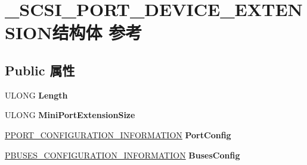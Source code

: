 \hypertarget{struct___s_c_s_i___p_o_r_t___d_e_v_i_c_e___e_x_t_e_n_s_i_o_n}{}\section{\+\_\+\+S\+C\+S\+I\+\_\+\+P\+O\+R\+T\+\_\+\+D\+E\+V\+I\+C\+E\+\_\+\+E\+X\+T\+E\+N\+S\+I\+O\+N结构体 参考}
\label{struct___s_c_s_i___p_o_r_t___d_e_v_i_c_e___e_x_t_e_n_s_i_o_n}
\subsection*{Public 属性}
\begin{DoxyCompactItemize}
\item 
\mbox{\label{struct___s_c_s_i___p_o_r_t___d_e_v_i_c_e___e_x_t_e_n_s_i_o_n_a90529db2da91788a5872c07b2e9a221b}} 
U\+L\+O\+NG {\bfseries Length}
\item 
\mbox{\label{struct___s_c_s_i___p_o_r_t___d_e_v_i_c_e___e_x_t_e_n_s_i_o_n_ab9b46eb57c1fa0cb274417f53e8636fd}} 
U\+L\+O\+NG {\bfseries Mini\+Port\+Extension\+Size}
\item 
\mbox{\label{struct___s_c_s_i___p_o_r_t___d_e_v_i_c_e___e_x_t_e_n_s_i_o_n_a2fc432ca7abd11e2057952b240f2b125}} 
\hyperlink{struct___p_o_r_t___c_o_n_f_i_g_u_r_a_t_i_o_n___i_n_f_o_r_m_a_t_i_o_n}{P\+P\+O\+R\+T\+\_\+\+C\+O\+N\+F\+I\+G\+U\+R\+A\+T\+I\+O\+N\+\_\+\+I\+N\+F\+O\+R\+M\+A\+T\+I\+ON} {\bfseries Port\+Config}
\item 
\mbox{\label{struct___s_c_s_i___p_o_r_t___d_e_v_i_c_e___e_x_t_e_n_s_i_o_n_ae8b117dc442642a62c3c8fc3ebb172d2}} 
\hyperlink{struct___b_u_s_e_s___c_o_n_f_i_g_u_r_a_t_i_o_n___i_n_f_o_r_m_a_t_i_o_n}{P\+B\+U\+S\+E\+S\+\_\+\+C\+O\+N\+F\+I\+G\+U\+R\+A\+T\+I\+O\+N\+\_\+\+I\+N\+F\+O\+R\+M\+A\+T\+I\+ON} {\bfseries Buses\+Config}
\item 
\mbox{\label{struct___s_c_s_i___p_o_r_t___d_e_v_i_c_e___e_x_t_e_n_s_i_o_n_acbd3ca4006fa7b0343c75553133908e7}} 

\end{DoxyCompactItemize}
